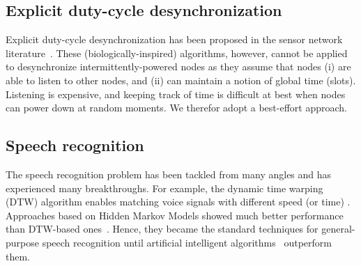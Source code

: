 \subsection{Explicit duty-cycle desynchronization}%
Explicit duty-cycle desynchronization has been proposed in the sensor network literature~\cite{degesys2007desync,giusti2007decentralized,zheng2013survey}. 
These (biologically-inspired) algorithms, however, cannot be applied to desynchronize intermittently-powered nodes as they assume that nodes (i) are able to listen to other nodes, and (ii) can maintain a notion of global time (slots). Listening is expensive, and keeping track of time is difficult at best when nodes can power down at random moments. We therefor adopt a best-effort approach.

\subsection{Speech recognition}

The speech recognition problem has been tackled from many angles and has experienced many breakthroughs. For example, the dynamic time warping (DTW) algorithm enables matching voice signals with different speed (or time) \cite{vintsyuk1968speech}. 
Approaches based on Hidden Markov Models showed much better performance than DTW-based ones~\cite{jelinek1997statistical}. Hence, they became the standard techniques for general-purpose speech recognition until artificial intelligent algorithms~\cite{hinton2012deep} outperform them. 

